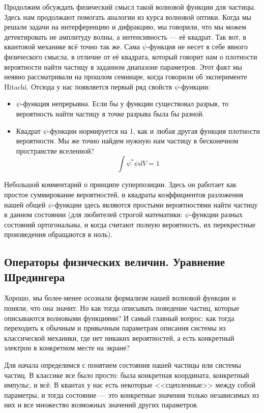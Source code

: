 \documentclass[12pt]{article}
\begin{document}
Продолжим обсуждать физический смысл такой волновой функции для частицы. Здесь нам продолжают помогать аналогии из курса волновой оптики. Когда мы решали задачи на интерференцию и дифракцию, мы говорили, что мы можем детектировать не амплитуду волны, а интенсивность --- её квадрат. Так вот, в квантовой механике всё точно так же. Сама $\psi$-функция  не несет в себе явного физического смысла, в отличие от её квадрата, который говорит нам о плотности вероятности найти частицу в заданном диапазоне параметров. Этот факт мы неявно рассматривали на прошлом семинаре, когда говорили об эксперименте Hitachi.  Отсюда у нас появляется первый ряд свойств $\psi$-функции:
\begin{itemize}
    \item $\psi$-функция непрерывна. Если бы у функции существовал разрыв, то вероятность найти частицу в точке разрыва была бы разной.
    \item Квадрат $\psi$-функции нормируется на 1, как и любая другая функция плотности вероятности. Мы же точно найдем нужную нам частицу в бесконечном пространстве вселенной? $$\int\psi^*\psi dV = 1$$
\end{itemize}
Небольшой комментарий о принципе суперпозиции. Здесь он работает как простое суммирование вероятностей, и квадраты коэффициентов разложения нашей общей $\psi$-функции здесь являются простыми вероятностями найти частицу в данном состоянии (для любителей строгой математики: $\psi$-функции разных состояний ортогональны, и когда считают полную вероятность, их перекрестные произведения обращаются в ноль).

\subsection{Операторы физических величин. Уравнение Шредингера}
Хорошо, мы более-менее осознали формализм нашей волновой функции и поняли, что она значит. Но как тогда описывать поведение частиц, которые описываются волновыми функциями? И самый главный вопрос: как тогда переходить к обычным и привычным параметрам описания системы из классической механики, где нет никаких вероятностей, а есть конкретный электрон в конкретном месте на экране?

Для начала определимся с понятием состояния нашей частицы или системы частиц. В классике все было просто: была конкретная координата, конкретный импульс, и всё. В квантах у нас есть некоторые <<сцепленные>> между собой параметры, и тогда состояние --- это конкретные значения только независимых из них и все множество возможных значений других параметров.
\end{document}

